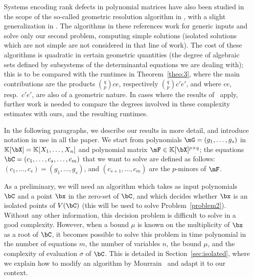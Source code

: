 \documentclass[12pt]{article}
\begin{document}
Systems encoding rank defects in polynomial matrices have also been
studied in the scope of the so-called geometric resolution algorithm
in \cite{BaGiHeLeMaSo15}, with a slight generalization in
\cite{SaSp16}. The algorithms in these references work for generic
inputs and solve only our second problem, computing simple solutions
(isolated solutions which are not simple are not considered in that
line of work). The cost of these algorithms is quadratic in certain
geometric quantities (the degree of algebraic sets defined by
subsystems of the determinantal equations we are dealing with); this
is to be compared with the runtimes in Theorem~\ref{theo:3}, where the
main contributions are the products ${q \choose p} c e$, respectively
${q \choose p} c' e'$, and where $ce$, resp.\ $c'e'$, are also of a
geometric nature.  In cases where the results
of~\cite{BaGiHeLeMaSo15,SaSp16} apply, further work is needed to
compare the degrees involved in these complexity estimates with ours, and the
resulting runtimes.

\medskip In the following paragraphs, we describe our results in more
detail, and introduce notation in use in all the paper. We start from
polynomials $\mG=(g_1,\dots,g_s)$ in $\KK[\bX]=\KK[X_1,\dots,X_n]$ and
polynomial matrix $\mF \in \KK[\bX]^{p \times q}$; the equations
$\bC=(c_1,\dots,c_{s},\dots,c_m)$ that we want to solve are defined as
follows: $(c_1,\dots,c_{s})=(g_1,\dots,g_s)$, and
$(c_{s+1},\dots,c_{m})$ are the $p$-minors of $\mF$.

As a preliminary, we will need an algorithm which takes as input
polynomials $\bC$ and a point $\bx$ in the zero-set of $\bC$, and
which decides whether $\bx$ is an isolated points of $V(\bC)$ (this
will be used to solve Problem~\eqref{problem2}).  Without any other
information, this decision problem is difficult to solve in a good
complexity. However, when a bound $\mu$ is known on the multiplicity
of $\bx$ as a root of $\bC$, it becomes possible to solve this problem
in time polynomial in the number of equations $m$, the number of
variables $n$, the bound $\mu$, and the complexity of evaluation
$\sigma$ of $\bC$. This is detailed in Section~\ref{sec:isolated},
where we explain how to modify an algorithm by
Mourrain~\cite{Mourrain97} and adapt it to our context.
\end{document}
